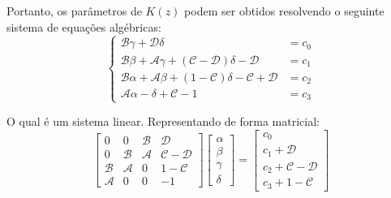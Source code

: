 \documentclass[]{politex}
\begin{document}
Portanto, os parâmetros de $K(z)$ podem ser obtidos resolvendo o seguinte sistema de equações algébricas:
\begin{equation}
\begin{cases}
\mathcal{B} \gamma  + \mathcal{D} \delta &= c_0 \\
\mathcal{B} \beta + \mathcal{A} \gamma +(\mathcal{C}  -  \mathcal{D}) \delta -\mathcal{D} &= c_1  \\
\mathcal{B} \alpha + \mathcal{A} \beta + (1 -\mathcal{C}) \delta -\mathcal{C} +\mathcal{D} &= c_2 \\
\mathcal{A} \alpha -\delta +\mathcal{C} -1 &= c_3
\end{cases}
\end{equation}

O qual é um sistema linear. Representando de forma matricial:
\begin{equation}
\begin{bmatrix}
0 & 0 & \mathcal{B} & \mathcal{D} \\
0 & \mathcal{B} & \mathcal{A} & \mathcal{C} - \mathcal{D} \\
\mathcal{B} & \mathcal{A} & 0 & 1 - \mathcal{C} \\
\mathcal{A} & 0 & 0 & -1
\end{bmatrix}
\begin{bmatrix}
\alpha \\
\beta \\
\gamma \\
\delta
\end{bmatrix}
=
\begin{bmatrix}
c_0 \\
c_1 + \mathcal{D} \\
c_2 + \mathcal{C} - \mathcal{D} \\
c_3 + 1 - \mathcal{C}
\end{bmatrix}
\end{equation}
\end{document}
